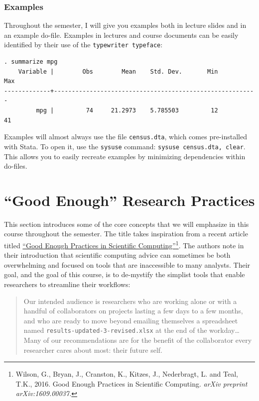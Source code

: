 \documentclass[]{book}
\let\rmarkdownfootnote\footnote%
\def\footnote{\protect\rmarkdownfootnote}
\theoremstyle{definition}
\theoremstyle{definition}
\theoremstyle{remark}
\begin{document}
\subsection{Examples}\label{examples}

Throughout the semester, I will give you examples both in lecture slides
and in an example do-file. Examples in lectures and course documents can
be easily identified by their use of the \texttt{typewriter\ typeface}:

\begin{verbatim}
. summarize mpg
    Variable |        Obs        Mean    Std. Dev.       Min        Max
-------------+---------------------------------------------------------
         mpg |         74     21.2973    5.785503         12         41
\end{verbatim}

Examples will almost always use the file \texttt{census.dta}, which
comes pre-installed with Stata. To open it, use the \texttt{sysuse}
command: \texttt{sysuse\ census.dta,\ clear}. This allows you to easily
recreate examples by minimizing dependencies within do-files.

\chapter{\texorpdfstring{``Good Enough'' Research
Practices}{Good Enough Research Practices}}\label{good-enough-research-practices}

This section introduces some of the core concepts that we will emphasize
in this course throughout the semester. The title takes inspiration from
a recent article titled \href{https://arxiv.org/abs/1609.00037}{``Good
Enough Practices in Scientific Computing''}\footnote{Wilson, G., Bryan,
  J., Cranston, K., Kitzes, J., Nederbragt, L. and Teal, T.K., 2016.
  Good Enough Practices in Scientific Computing. \emph{arXiv preprint
  arXiv:1609.00037.}}. The authors note in their introduction that
scientific computing advice can sometimes be both overwhelming and
focused on tools that are inaccessible to many analysts. Their goal, and
the goal of this course, is to de-mystify the simplist tools that enable
researchers to streamline their workflows:

\begin{quote}
Our intended audience is researchers who are working alone or with a
handful of collaborators on projects lasting a few days to a few months,
and who are ready to move beyond emailing themselves a spreadsheet named
\texttt{results-updated-3-revised.xlsx} at the end of the
workday\ldots{}Many of our recommendations are for the benefit of the
collaborator every researcher cares about most: their future self.
\end{quote}
\end{document}
